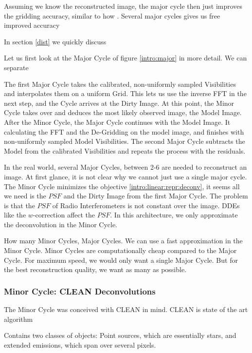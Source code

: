 Assuming we know the reconstructed image, the major cycle then just improves the gridding accuracy, similar to how \cite{kunisnonequispaced}.
Several major cycles gives us free improved accuracy 

In section \ref{dist} we quickly discuss





Let us first look at the Major Cycle of figure \ref{intro:major} in more detail. We can separate


The first Major Cycle takes the calibrated, non-uniformly sampled Visibilities and interpolates them on a uniform Grid. This lets us use the inverse FFT in the next step, and the Cycle arrives at the Dirty Image. At this point, the Minor Cycle takes over and deduces the most likely observed image, the Model Image. After the Minor Cycle, the Major Cycle continues with the Model Image. It calculating the FFT and the De-Gridding on the model image, and finishes with non-uniformly sampled Model Visibilities. The second Major Cycle subtracts the Model from the calibrated Visibilities and repeats the process with the residuals.

In the real world, several Major Cycles, between 2-6 are needed to reconstruct an image.
At first glance, it is not clear why we cannot just use a single major cycle. The Minor Cycle minimizes the objective \eqref{intro:linear:repr:deconv}, it seems all we need is the $PSF$ and the Dirty Image from the first Major Cycle. The problem is that the $PSF$ of Radio Interferometers is not constant over the image. DDEs like the $w$-correction affect the $PSF$. In this architecture, we only approximate the deconvolution in the Minor Cycle. 

How many Minor Cycles, Major Cycles. We can use a fast approximation in the Minor Cycle. Minor Cycles are computationally cheap compared to the Major Cycle. For maximum speed, we would only want a single Major Cycle. But for the best reconstruction quality, we want as many as possible.

\subsubsection{Minor Cycle: CLEAN Deconvolutions}

The Minor Cycle was conceived with CLEAN in mind.
CLEAN is state of the art algorithm

Contains two classes of objects: Point sources, which are essentially stars, and extended emissions, which span over several pixels.


